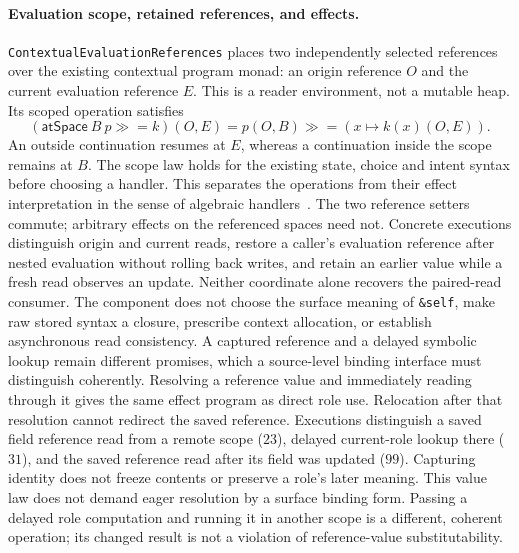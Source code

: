 \documentclass[11pt]{article}
\theoremstyle{definition}
\theoremstyle{remark}
\begin{document}
\paragraph{Evaluation scope, retained references, and effects.}
\texttt{ContextualEvaluationReferences} places two independently selected
references over the existing contextual program monad: an origin reference
$O$ and the current evaluation reference $E$. This is a reader environment,
not a mutable heap. Its scoped operation satisfies
\[
 (\mathsf{atSpace}\ B\ p \mathbin{\gg\!=} k)(O,E)
 =p(O,B)\mathbin{\gg\!=}(x\mapsto k(x)(O,E)).
\]
An outside continuation resumes at $E$, whereas a continuation inside the
scope remains at $B$. The scope law holds for the existing state, choice and
intent syntax before choosing a handler. This separates the operations from
their effect interpretation in the sense of algebraic
handlers~\cite{PlotkinPretnarHandling}.
The two reference setters commute; arbitrary effects on the referenced
spaces need not. Concrete executions distinguish origin and current reads,
restore a caller's evaluation reference after nested evaluation without
rolling back writes, and retain an earlier value while a fresh read observes
an update. Neither coordinate alone recovers the paired-read consumer.
The component does not choose the surface meaning of \texttt{\&self}, make
raw stored syntax a closure, prescribe context allocation, or establish
asynchronous read consistency. A captured reference and a delayed symbolic
lookup remain different promises, which a source-level binding interface
must distinguish coherently.
Resolving a reference value and immediately reading through it gives the same
effect program as direct role use. Relocation after that resolution cannot
redirect the saved reference. Executions distinguish a saved field reference
read from a remote scope ($23$), delayed current-role lookup there ($31$), and
the saved reference read after its field was updated ($99$). Capturing identity
does not freeze contents or preserve a role's later meaning.
This value law does not demand eager resolution by a surface binding form.
Passing a delayed role computation and running it in another scope is a
different, coherent operation; its changed result is not a violation of
reference-value substitutability.
\end{document}
